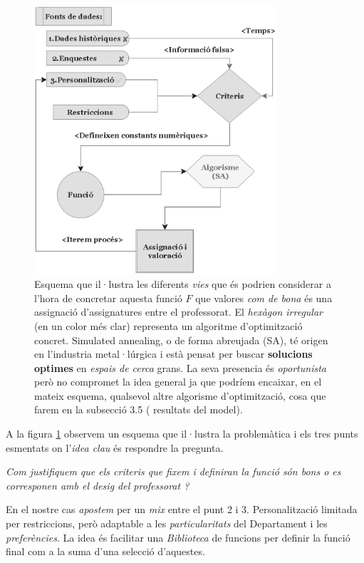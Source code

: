 \documentclass[10pt,twocolumn]{article}
\begin{document}
\begin{figure}
	\centering
	\includegraphics[width=9cm]{algor_bl}
	\caption{ \footnotesize Esquema que il·lustra les diferents \textit{vies} que és podrien considerar a l'hora de concretar aquesta funció $F$ que valores \textit{com de bona}  és una assignació d'assignatures entre el professorat. El \textit{hexàgon irregular}   (en un color més clar) representa un algoritme d'optimització concret. Simulated annealing, o de forma abreujada (SA), té origen en l'industria metal·lúrgica i està pensat per buscar \textbf{solucions optimes} en \textit{espais de cerca} grans. La seva presencia és \textit{oportunista} però no compromet la idea general ja que podríem encaixar, en el mateix esquema, qualsevol altre algorisme d'optimització, cosa que farem en la subsecció 3.5 ( resultats del model).}
	\label{fig:4}
\end{figure}
A la figura \ref{fig:4} observem un esquema que il·lustra la problemàtica i els tres punts esmentats on  l'\textit{idea clau} és respondre la pregunta.
\vspace{1mm}

\textit{Com justifiquem que els criteris que fixem i definiran la funció són bons o es corresponen amb el desig del professorat ?} 
 
\vspace{1mm}
En el nostre cas \textit{apostem} per un \textit{mix} entre el punt 2 i 3. Personalització limitada per restriccions, però adaptable a les \textit{particularitats} del Departament i les \textit{preferències}. La idea és facilitar una \textit{Biblioteca} de funcions per definir la funció final com a la suma d'una selecció d'aquestes.
\end{document}
